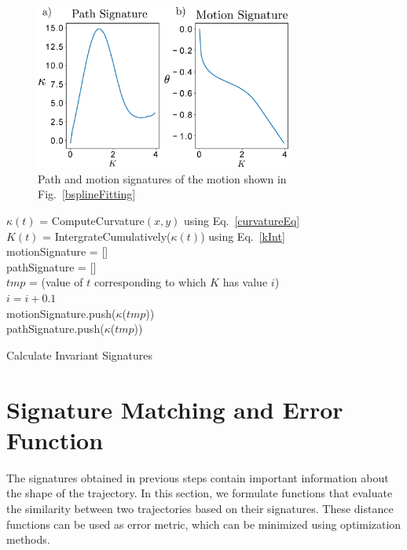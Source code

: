 \documentclass[twocolumn,10pt]{asme2ej}
\begin{document}
\begin{figure}
\centering
\includegraphics[width=240pt]{figure/fig_signatures.eps}
  \caption{Path and motion signatures of the motion shown in Fig.~\ref{bsplineFitting}}
\label{signature}
\end{figure}


\begin{algorithm}
    $\kappa(t)$ = ComputeCurvature$(x, y)$ using Eq.~\ref{curvatureEq} \\
    $K(t)$ = IntergrateCumulatively($\kappa(t)$) using Eq.~\ref{kInt} \\
    motionSignature = [] \\
    pathSignature = [] \\
    {
      $tmp$ = (value of $t$ corresponding to which $K$ has value $i$) \\
      $i = i + 0.1$ \\
      motionSignature.push($\kappa$($tmp$)) \\
      pathSignature.push($\kappa$($tmp$))
    }
    \caption{Calculate Invariant Signatures}
    \label{alg_signature}
\end{algorithm}

\section{Signature Matching and Error Function}\label{sec_distanceMetric}
The signatures obtained in previous steps contain important information about the shape of the trajectory.
In this section, we formulate functions that evaluate the similarity between two trajectories based on their signatures.
These distance functions can be used as error metric, which can be minimized using optimization methods.
\end{document}
